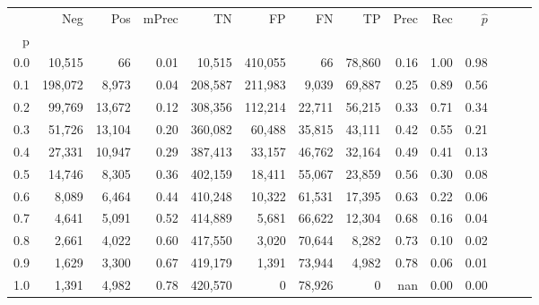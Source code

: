 \begin{tabular}{rrrrrrrrrrrrrr}
\toprule
{} &      Neg &     Pos & mPrec &       TN &       FP &      FN &      TP &  Prec &   Rec & $\hat{p}$ \\
p   &          &         &       &          &          &         &         &       &       &           \\
\midrule
0.0 &   10,515 &      66 &  0.01 &   10,515 &  410,055 &      66 &  78,860 &  0.16 &  1.00 &      0.98 \\
0.1 &  198,072 &   8,973 &  0.04 &  208,587 &  211,983 &   9,039 &  69,887 &  0.25 &  0.89 &      0.56 \\
0.2 &   99,769 &  13,672 &  0.12 &  308,356 &  112,214 &  22,711 &  56,215 &  0.33 &  0.71 &      0.34 \\
0.3 &   51,726 &  13,104 &  0.20 &  360,082 &   60,488 &  35,815 &  43,111 &  0.42 &  0.55 &      0.21 \\
0.4 &   27,331 &  10,947 &  0.29 &  387,413 &   33,157 &  46,762 &  32,164 &  0.49 &  0.41 &      0.13 \\
0.5 &   14,746 &   8,305 &  0.36 &  402,159 &   18,411 &  55,067 &  23,859 &  0.56 &  0.30 &      0.08 \\
0.6 &    8,089 &   6,464 &  0.44 &  410,248 &   10,322 &  61,531 &  17,395 &  0.63 &  0.22 &      0.06 \\
0.7 &    4,641 &   5,091 &  0.52 &  414,889 &    5,681 &  66,622 &  12,304 &  0.68 &  0.16 &      0.04 \\
0.8 &    2,661 &   4,022 &  0.60 &  417,550 &    3,020 &  70,644 &   8,282 &  0.73 &  0.10 &      0.02 \\
0.9 &    1,629 &   3,300 &  0.67 &  419,179 &    1,391 &  73,944 &   4,982 &  0.78 &  0.06 &      0.01 \\
1.0 &    1,391 &   4,982 &  0.78 &  420,570 &        0 &  78,926 &       0 &   nan &  0.00 &      0.00 \\
\bottomrule
\end{tabular}

